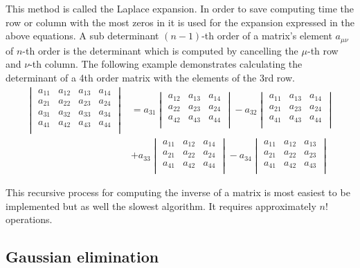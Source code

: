 This method is called the Laplace expansion.  In order to save
computing time the row or column with the most zeros in it is used for
the expansion expressed in the above equations.  A sub determinant
$(n-1)$-th order of a matrix's element $a_{\mu\nu}$ of $n$-th order is
the determinant which is computed by cancelling the $\mu$-th row and
$\nu$-th column.  The following example demonstrates calculating the
determinant of a 4th order matrix with the elements of the 3rd row.
\begin{align}
\begin{vmatrix}
a_{11} & a_{12} & a_{13} & a_{14}\\
a_{21} & a_{22} & a_{23} & a_{24}\\
a_{31} & a_{32} & a_{33} & a_{34}\\
a_{41} & a_{42} & a_{43} & a_{44}\\
\end{vmatrix}
&= a_{31}
\begin{vmatrix}
a_{12} & a_{13} & a_{14}\\
a_{22} & a_{23} & a_{24}\\
a_{42} & a_{43} & a_{44}\\
\end{vmatrix}
- a_{32}
\begin{vmatrix}
a_{11} & a_{13} & a_{14}\\
a_{21} & a_{23} & a_{24}\\
a_{41} & a_{43} & a_{44}\\
\end{vmatrix}\\
\nonumber
&+ a_{33}
\begin{vmatrix}
a_{11} & a_{12} & a_{14}\\
a_{21} & a_{22} & a_{24}\\
a_{41} & a_{42} & a_{44}\\
\end{vmatrix}
- a_{34}
\begin{vmatrix}
a_{11} & a_{12} & a_{13}\\
a_{21} & a_{22} & a_{23}\\
a_{41} & a_{42} & a_{43}\\
\end{vmatrix}
\end{align}

This recursive process for computing the inverse of a matrix is most
easiest to be implemented but as well the slowest algorithm.  It
requires approximately $n!$ operations.

\subsection{Gaussian elimination}

